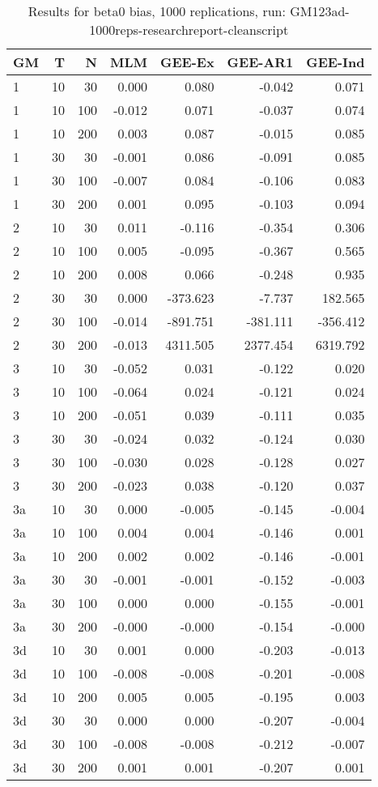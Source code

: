 \begin{table}[ht]
\centering
\begin{tabular}{lrrrrrr}
  \hline
GM & T & N & MLM & GEE-Ex & GEE-AR1 & GEE-Ind \\ 
  \hline
1 & 10 & 30 & 0.000 & 0.080 & -0.042 & 0.071 \\ 
  1 & 10 & 100 & -0.012 & 0.071 & -0.037 & 0.074 \\ 
  1 & 10 & 200 & 0.003 & 0.087 & -0.015 & 0.085 \\ 
  1 & 30 & 30 & -0.001 & 0.086 & -0.091 & 0.085 \\ 
  1 & 30 & 100 & -0.007 & 0.084 & -0.106 & 0.083 \\ 
  1 & 30 & 200 & 0.001 & 0.095 & -0.103 & 0.094 \\ 
  2 & 10 & 30 & 0.011 & -0.116 & -0.354 & 0.306 \\ 
  2 & 10 & 100 & 0.005 & -0.095 & -0.367 & 0.565 \\ 
  2 & 10 & 200 & 0.008 & 0.066 & -0.248 & 0.935 \\ 
  2 & 30 & 30 & 0.000 & -373.623 & -7.737 & 182.565 \\ 
  2 & 30 & 100 & -0.014 & -891.751 & -381.111 & -356.412 \\ 
  2 & 30 & 200 & -0.013 & 4311.505 & 2377.454 & 6319.792 \\ 
  3 & 10 & 30 & -0.052 & 0.031 & -0.122 & 0.020 \\ 
  3 & 10 & 100 & -0.064 & 0.024 & -0.121 & 0.024 \\ 
  3 & 10 & 200 & -0.051 & 0.039 & -0.111 & 0.035 \\ 
  3 & 30 & 30 & -0.024 & 0.032 & -0.124 & 0.030 \\ 
  3 & 30 & 100 & -0.030 & 0.028 & -0.128 & 0.027 \\ 
  3 & 30 & 200 & -0.023 & 0.038 & -0.120 & 0.037 \\ 
  3a & 10 & 30 & 0.000 & -0.005 & -0.145 & -0.004 \\ 
  3a & 10 & 100 & 0.004 & 0.004 & -0.146 & 0.001 \\ 
  3a & 10 & 200 & 0.002 & 0.002 & -0.146 & -0.001 \\ 
  3a & 30 & 30 & -0.001 & -0.001 & -0.152 & -0.003 \\ 
  3a & 30 & 100 & 0.000 & 0.000 & -0.155 & -0.001 \\ 
  3a & 30 & 200 & -0.000 & -0.000 & -0.154 & -0.000 \\ 
  3d & 10 & 30 & 0.001 & 0.000 & -0.203 & -0.013 \\ 
  3d & 10 & 100 & -0.008 & -0.008 & -0.201 & -0.008 \\ 
  3d & 10 & 200 & 0.005 & 0.005 & -0.195 & 0.003 \\ 
  3d & 30 & 30 & 0.000 & 0.000 & -0.207 & -0.004 \\ 
  3d & 30 & 100 & -0.008 & -0.008 & -0.212 & -0.007 \\ 
  3d & 30 & 200 & 0.001 & 0.001 & -0.207 & 0.001 \\ 
   \hline
\end{tabular}
\caption{Results for beta0 bias, 1000 replications, run: GM123ad-1000reps-researchreport-cleanscript} 
\label{tab:beta0_bias}
\end{table}
